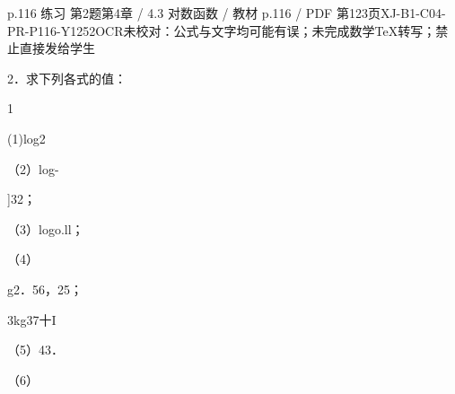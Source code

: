 \begin{bankitem}{p.116 练习 第2题}{第4章 / 4.3 对数函数 / 教材 p.116 / PDF 第123页}{XJ-B1-C04-PR-P116-Y1252}{OCR未校对：公式与文字均可能有误；未完成数学TeX转写；禁止直接发给学生}
\begin{ocrdraft}
\par
2．求下列各式的值：
\par
1
\par
(1)log2
\par
（2）log-
\par
]32；
\par
（3）logo.ll；
\par
（4）
\par
g2．56，25；
\par
3kg37十I
\par
（5）43．
\par
（6）
\end{ocrdraft}
\end{bankitem}

